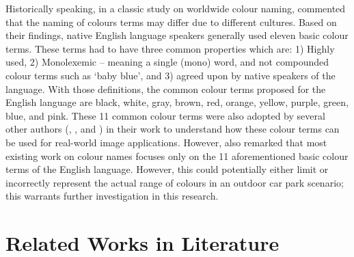 Historically speaking, in a classic study on worldwide colour naming,  commented
that the naming of colours terms may differ due to different cultures. Based on their findings, native English language speakers generally used eleven basic colour terms. These terms had to have three common properties which are: 1) Highly used, 2) Monolexemic -- meaning a single (mono) word, and not compounded colour terms such as `baby blue', and 3) agreed upon by native speakers of the language. With those definitions, the common colour terms proposed for the English language are black, white, gray, brown, red, orange, yellow, purple, green, blue, and pink. These 11 common colour terms were also adopted by
several other authors (, ,
and ) in their work to understand how these colour
terms can be used for real-world image applications.
However,  also remarked that most existing work on colour names focuses only on the 11 aforementioned basic colour terms of the English language.
However, this could potentially either limit or incorrectly represent the actual range of colours in an outdoor car park scenario; this warrants further investigation in this research. %


\section{Related Works in Literature}
\label{section:relatedworks}

